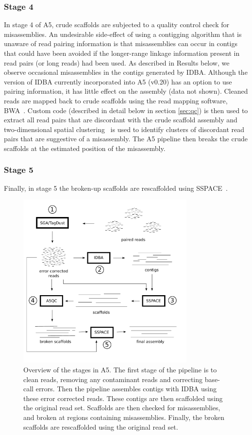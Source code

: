 \documentclass{bioinfo}
\begin{document}
\begin{methods}
\subsubsection{Stage 4}
In stage 4 of A5, crude 
scaffolds are subjected to a quality control check for misassemblies. 
An undesirable side-effect of using a contigging algorithm that is unaware of read pairing information is that misassemblies can occur in contigs 
that could have been avoided if the longer-range linkage information present in read pairs (or long reads) had been used.  As described in Results 
below, we observe occasional misassemblies in the contigs generated by IDBA. Although the version of IDBA currently incorporated into A5 (v0.20) has
an option to use pairing information, it has little effect on the assembly (data not shown). 
Cleaned reads are mapped back to crude scaffolds using the read mapping software,
BWA~\citep{bwa}. Custom code (described in detail below in section \ref{sec:qc}) is then used to extract all read pairs that are discordant with the 
crude scaffold assembly and two-dimensional spatial clustering~\citep{DBSCAN} is used to identify clusters of discordant read pairs that are 
suggestive of a misassembly. The A5 pipeline then breaks the crude scaffolds at the estimated position of the misassembly.

\subsubsection{Stage 5}
Finally, in stage 5 the broken-up scaffolds are rescaffolded using SSPACE~\citep{Boetzer2011}.
\end{methods}


\begin{figure}[t]
\includegraphics[width=3.5in]{a5pipeline-diagram.pdf}
\vspace{-1cm}
\caption{Overview of the stages in A5. The first stage of the pipeline is to clean reads, removing any contaminant
reads and correcting base-call errors. Then the pipeline assembles contigs with IDBA using these error corrected reads. These
contigs are then scaffolded using the original read set. Scaffolds are then checked for misassemblies, and broken at regions
containing misassemblies. Finally, the broken scaffolds are rescaffolded using the original read set.}\label{fig:01}
\end{figure}
\end{document}
